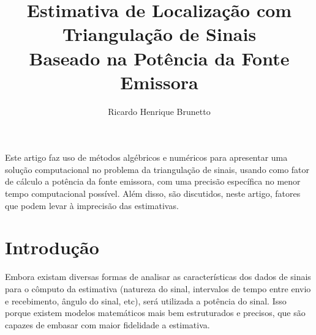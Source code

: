 

\sloppy

\title{Estimativa de Localização com Triangulação de Sinais\\Baseado na Potência da Fonte Emissora}

\author{Ricardo Henrique Brunetto}


\address{Departamento de Informática -- Universidade Estadual de Maringá (UEM)\\
	Maringá -- PR -- Brasil
}



	\maketitle

	\begin{resumo}
		Este artigo faz uso de métodos algébricos e numéricos para apresentar uma solução computacional
		no problema da triangulação de sinais, usando como fator de cálculo a potência da fonte emissora,
		com uma precisão específica no menor tempo computacional possível. Além disso, são discutidos, neste artigo,
		fatores que podem levar à imprecisão das estimativas.
	\end{resumo}

  \section{Introdução}
	\label{sec:introducao}
	Embora existam diversas formas de analisar as características dos dados de sinais para o cômputo
	da estimativa (natureza do sinal, intervalos de tempo entre envio e recebimento, ângulo do sinal, etc),
	será utilizada a potência do sinal. Isso porque existem modelos matemáticos mais bem
	estruturados e precisos, que são capazes de embasar com maior fidelidade a estimativa.

